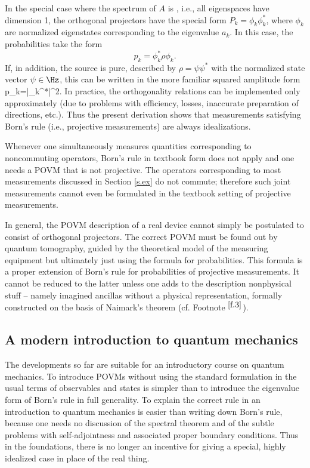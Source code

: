 \documentclass[12pt]{article}
\begin{document}
In the special case where the spectrum of $A$ is ,
i.e., all eigenspaces have dimension 1, the orthogonal projectors have
the special form $P_k=\phi_k\phi_k^*$, where $\phi_k$ are normalized
eigenstates corresponding to the eigenvalue $a_k$. In this case, the
probabilities take the form
\[
p_k=\phi_k^*\rho\phi_k.
\]
If, in addition, the source is pure, described by $\rho=\psi\psi^*$ with
the normalized state vector $\psi\in\Hz$, this can be written in the
more familiar squared amplitude form
p_k=|\phi_k^*\psi|^2.
\eeq
In practice, the orthogonality relations  can be
implemented only approximately (due to problems with efficiency, losses,
inaccurate preparation of directions, etc.). Thus the present
derivation shows that measurements satisfying Born's rule
(i.e., projective measurements) are always idealizations.

Whenever one simultaneously measures quantities
corresponding to noncommuting operators, Born's rule in textbook form
does not apply and one needs a POVM that is not projective.
The operators corresponding to most measurements discussed in Section
\ref{s.ex} do not commute; therefore such joint measurements cannot
even be formulated in the textbook setting of projective measurements.

In general, the POVM description of a real device cannot simply be
postulated to consist of orthogonal projectors. The correct POVM must be
found out by quantum tomography, guided by the theoretical model of the
measuring equipment but ultimately just using the formula
 for probabilities. This formula is a proper extension
of Born's rule for probabilities of projective measurements.
It cannot be reduced to the latter unless one adds to the description
nonphysical stuff -- namely imagined ancillas without a physical
representation, formally constructed on the basis of Naimark's theorem
(cf. Footnote ${}^{\ref{f.3}}$).



\subsection{A modern introduction to quantum mechanics}
\label{ss.introQM}

The developments so far are suitable for an introductory course on 
quantum mechanics. To introduce POVMs without using the standard
formulation in the usual terms of observables and states is simpler
than to introduce the eigenvalue form of Born's rule in full generality.
To explain the correct rule in an introduction to quantum mechanics is 
easier than writing down Born's rule, because one needs no discussion 
of the spectral theorem and of the subtle problems with self-adjointness
and associated proper boundary conditions. Thus in the foundations, 
there is no longer an incentive for giving a special, highly idealized
case in place of the real thing.
\end{document}
